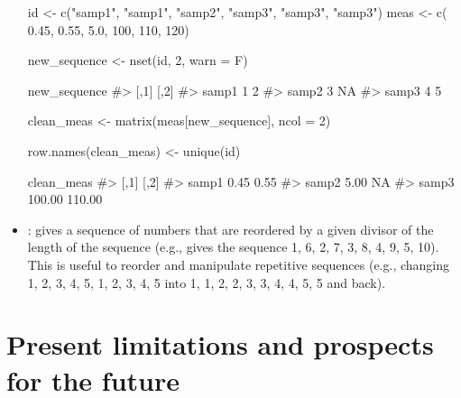\begin{itemize}
\begin{example}
id   <- c("samp1", "samp1", "samp2", "samp3", "samp3", "samp3")
meas <- c(   0.45,    0.55,     5.0,     100,     110,     120)
	
new_sequence <- nset(id, 2, warn = F)
	
new_sequence
#>       [,1] [,2]
#> samp1    1    2
#> samp2    3   NA
#> samp3    4    5
	
clean_meas <- matrix(meas[new_sequence], ncol = 2)
	
row.names(clean_meas) <- unique(id)
	
clean_meas
#>         [,1]   [,2]
#> samp1   0.45   0.55
#> samp2   5.00     NA
#> samp3 100.00 110.00

\end{example}

	\item {}: gives a sequence of numbers that are reordered by a given divisor of the length of the sequence (e.g.,  gives the sequence 1, 6, 2, 7, 3, 8, 4, 9, 5, 10). This is useful to reorder and manipulate repetitive sequences (e.g., changing 1, 2, 3, 4, 5, 1, 2, 3, 4, 5 into 1, 1, 2, 2, 3, 3, 4, 4, 5, 5 and back). 
\end{itemize}

\section{Present limitations and prospects for the future}

